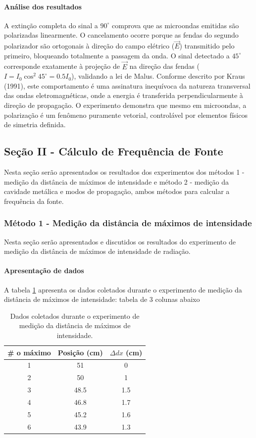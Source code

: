 \documentclass[12pt]{article}
\begin{document}
\paragraph{Análise dos resultados}
A extinção completa do sinal a \(90^\circ\) comprova que as
microondas emitidas são polarizadas linearmente. O cancelamento
ocorre porque as fendas do segundo polarizador são ortogonais à
direção do campo elétrico (\(\vec{E}\)) transmitido pelo primeiro,
bloqueando totalmente a passagem da onda. O sinal detectado a
\(45^\circ\) corresponde exatamente à projeção de \(\vec{E}\) na
direção das fendas (\(I = I_0 \cos^2 45^\circ = 0.5I_0\)), validando
a lei de Malus. Conforme descrito por Kraus (1991), este
comportamento é uma assinatura inequívoca da natureza transversal das
ondas eletromagnéticas, onde a energia é transferida
perpendicularmente à direção de propagação. O experimento demonstra
que mesmo em microondas, a polarização é um fenômeno puramente
vetorial, controlável por elementos físicos de simetria definida.

\subsection{Seção II - Cálculo de Frequência de Fonte}
Nesta seção serão apresentados os resultados dos experimentos dos
métodos 1 - medição da distância de máximos de intensidade e método 2 -
medição da cavidade metálica e modos de propagação, ambos métodos
para calcular a frequência da fonte.

\subsubsection{Método 1 - Medição da distância de máximos de intensidade}
Nesta seção serão apresentados e discutidos os resultados do experimento de
medição da distância de máximos de intensidade de radiação.

\paragraph{Apresentação de dados}
A tabela \ref{tab:metodo1dados} apresenta os dados coletados durante
o experimento de medição da distância de máximos de intensidade:
tabela de 3 colunas abaixo

\begin{table}[H]
  \centering
  \begin{tabular}{|c|c|c|}
    \hline
    \# o máximo & Posição (cm) & $\Delta dx$ (cm) \\
    \hline
    1 & 51 & 0 \\
    2 & 50 & 1 \\
    3 & 48.5 & 1.5 \\
    4 & 46.8 & 1.7 \\
    5 & 45.2 & 1.6 \\
    6 & 43.9 & 1.3 \\
    \hline
  \end{tabular}
  \caption{Dados coletados durante o experimento de medição da
  distância de máximos de intensidade.}
  \label{tab:metodo1dados}
\end{table}
\end{document}
